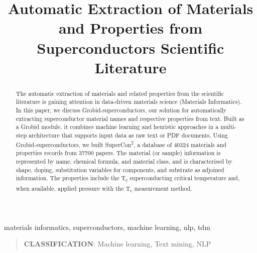 \documentclass[]{interact}
\theoremstyle{plain}%
\theoremstyle{definition}
\theoremstyle{remark}
\begin{document}

\title{Automatic Extraction of Materials and Properties from Superconductors Scientific Literature}

\author{
}


\maketitle

\begin{abstract}
    The automatic extraction of materials and related properties from the scientific literature is gaining attention in data-driven materials science (Materials Informatics).
    In this paper, we discuss Grobid-superconductors, our solution for automatically extracting superconductor material names and respective properties from text.
    Built as a Grobid module, it combines machine learning and heuristic approaches in a multi-step architecture that supports input data as raw text or PDF documents.
    Using Grobid-superconductors, we built SuperCon\textsuperscript{2}, a database of 40324 materials and properties records from 37700 papers.
    The material (or sample) information is represented by name, chemical formula, and material class, and is characterised by shape, doping, substitution variables for components, and substrate as adjoined information.
    The properties include the T\textsubscript{c} superconducting critical temperature and, when available, applied pressure with the T\textsubscript{c} measurement method.
\end{abstract}

\begin{keywords}
    materials informatics, superconductors, machine learning, nlp, tdm
\end{keywords}

\begin{quote}
    \textbf{CLASSIFICATION}: Machine learning, Text mining, NLP
\end{quote}
\end{document}
